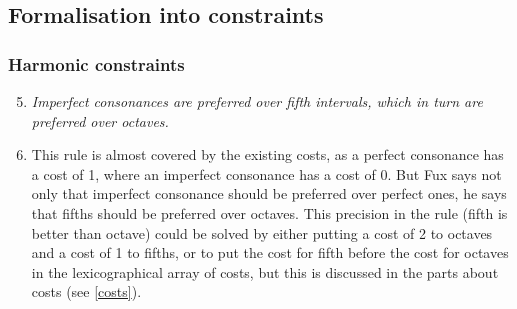 \subsection{Formalisation into constraints}\label{formalisation-c-4th}
\subsubsection{Harmonic constraints}
\begin{enumerate}[wide, label=\bfseries 4.H\arabic*]
    \setcounter{enumi}{4}
    \item \textit{Imperfect consonances are preferred over fifth intervals, which in turn are preferred over octaves.} \label{constraint:prefer-fifths-over-octaves}   
    \item  
    This rule is almost covered by the existing costs, as a perfect consonance has a cost of 1, where an imperfect consonance has a cost of 0. But Fux says not only that imperfect consonance should be preferred over perfect ones, he says that fifths should be preferred over octaves. This precision in the rule (fifth is better than octave) could be solved by either putting a cost of 2 to octaves and a cost of 1 to fifths, or to put the cost for fifth before the cost for octaves in the lexicographical array of costs, but this is discussed in the parts about costs (see \ref{costs}).

\end{enumerate}


